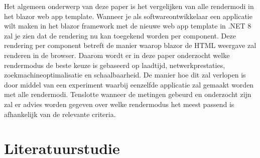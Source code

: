 \documentclass{hogent-article}
\begin{document}
Het algemeen onderwerp van deze paper is het vergelijken van alle rendermodi in het blazor web app template. Wanneer je als softwareontwikkelaar een 
applicatie wilt maken in het blazor framework met de nieuwe web app template in .NET 8 zal je zien dat de rendering nu kan toegekend worden per component. Deze rendering per component 
betreft de manier waarop blazor de HTML weergave zal renderen in de browser. Daarom wordt er in deze paper onderzocht welke
rendermodus de beste keuze is gebaseerd op laadtijd, netwerkprestaties, zoekmachineoptimalisatie en schaalbaarheid. De manier hoe dit zal verlopen is door middel van een experiment waarbij eenzelfde applicatie 
zal gemaakt worden met alle rendermodi. Tenslotte wanneer de metingen gebeurd en onderzocht zijn zal er advies worden gegeven over welke rendermodus het meest passend is afhankelijk van de relevante criteria.

\section{Literatuurstudie}%
\label{sec:literatuurstudie}
\end{document}
